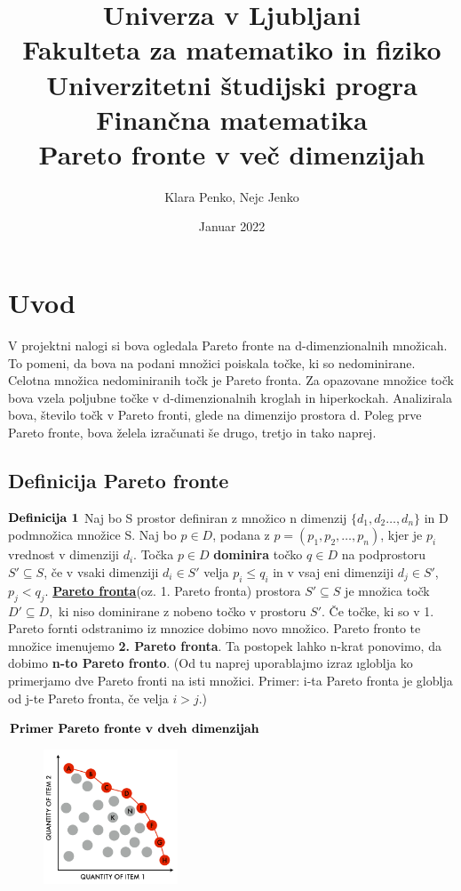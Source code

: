 \documentclass{article}
\title{
{\large{Univerza v Ljubljani}}\\ 
{\large{Fakulteta za matematiko in fiziko}}\\ 
{\large{Univerzitetni študijski progra Finančna matematika}}\\ 
\vspace{5cm}
{\textbf{Pareto fronte v več dimenzijah}
\vspace{5cm}}
}
\author{Klara Penko, Nejc Jenko}
\date{Januar 2022}
\begin{document}
\begin{titlepage}
    \maketitle
\end{titlepage}

\section{Uvod}
V projektni nalogi si bova ogledala Pareto fronte na d-dimenzionalnih množicah. To pomeni, da bova na podani množici poiskala točke, ki so nedominirane. Celotna množica nedominiranih točk je Pareto fronta.  Za opazovane množice točk bova vzela poljubne točke v d-dimenzionalnih kroglah in hiperkockah. Analizirala bova, število točk v Pareto fronti, glede na dimenzijo prostora d. Poleg prve Pareto fronte, bova želela izračunati še drugo, tretjo in tako naprej.


\subsection{Definicija Pareto fronte}
${\rm \textbf{Definicija 1}}$ Naj bo S prostor definiran z množico n dimenzij $\{d_{1},d_{2}\dots,d_{n}\}$ in D podmnožica množice S. Naj bo $p \in D$, podana z $p = (p_{1},p_{2},\dots,p_{n})$, kjer je $p_{i}$ vrednost v dimenziji $d_{i}$. Točka $p \in D$ \textbf{dominira} točko $q \in D$ na podprostoru $S'\subseteq S$, če v vsaki dimenziji $d_{i} \in S'$ velja $p_{i} \le q_{i}$ in v vsaj eni dimenziji $d_{j} \in S'$, $p_{j} < q_{j}$. \break
\underline{\textbf{Pareto fronta}}(oz. 1. Pareto fronta) prostora $S' \subseteq S$ je množica točk $D' \subseteq D,$ ki niso dominirane z nobeno točko v prostoru $S'$. Če točke, ki so v 1. Pareto fornti odstranimo iz mnozice dobimo novo množico. Pareto fronto te množice imenujemo \textbf{2. Pareto fronta}. Ta postopek lahko n-krat ponovimo, da dobimo \textbf{n-to Pareto fronto}.
(Od tu naprej uporablajmo izraz \i{globlja} ko primerjamo dve Pareto fronti na isti množici. Primer: i-ta Pareto fronta je globlja od j-te Pareto fronta, če velja $i > j$.)
\break

${\rm \textbf{Primer Pareto fronte v dveh dimenzijah}}$

\begin{figure}[htbp]
\includegraphics[width=4cm]{Slike/Slika_pareto_fronta.png}
\centering
\end{figure}
\end{document}
